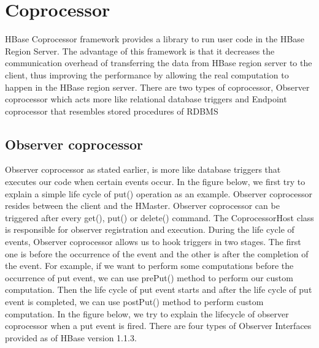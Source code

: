 \documentclass[11pt,a4paper,bibtotoc,idxtotoc,headsepline,footsepline,footexclude,BCOR12mm,DIV13]{scrbook}
\begin{document}
\newpage
\section{Coprocessor}
\label{sec:coprocessor}

HBase Coprocessor framework provides a library to run user code in the HBase Region Server. The advantage of this framework is that it decreases the communication overhead of transferring the data from HBase region server to the client, thus improving the performance by allowing the real computation to happen in the HBase region server\cite{coprocessor:coprocessor}. There are two types of coprocessor, Observer coprocessor  which acts more like relational database triggers and Endpoint coprocessor that resembles stored procedures of RDBMS\cite{coprocessor:types} 


\subsection{Observer coprocessor}
\label{sec:observercoprocessor}
Observer coprocessor as stated earlier, is more like database triggers that executes our code when certain events occur. In the figure below, we first try to explain a simple life cycle of put() operation as an example\cite{coprocessor:detail}. Observer coprocessor resides between the client and the HMaster. Observer coprocessor can be triggered after every get(), put() or delete() command. The CoprocessorHost class is responsible for observer registration and execution\cite{coprocessor:detail}.  During the life cycle of events, Observer coprocessor allows us to hook triggers in two stages. The first one is before the occurrence of the event and the other is after the completion of the event. For example, if we want to perform some computations before the occurrence of put event, we can use prePut() method to perform our custom computation. Then the life cycle of put event starts and after the life cycle of put event is completed, we can use postPut() method to perform custom computation. In the figure below, we try to explain the lifecycle of observer coprocessor when a put event is fired\cite{coprocessor:detail}.
\newline
There are four types of Observer Interfaces provided as of HBase version 1.1.3\cite{hbase:essential}.
\end{document}
